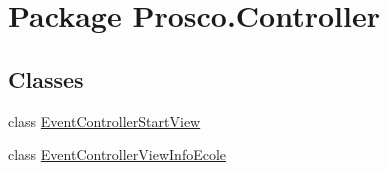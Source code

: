 \hypertarget{namespace_prosco_1_1_controller}{\section{Package Prosco.\-Controller}
\label{namespace_prosco_1_1_controller}
}
\subsection*{Classes}
\begin{DoxyCompactItemize}
\item 
class \hyperlink{class_prosco_1_1_controller_1_1_event_controller_start_view}{Event\-Controller\-Start\-View}
\item 
class \hyperlink{class_prosco_1_1_controller_1_1_event_controller_view_info_ecole}{Event\-Controller\-View\-Info\-Ecole}
\end{DoxyCompactItemize}
